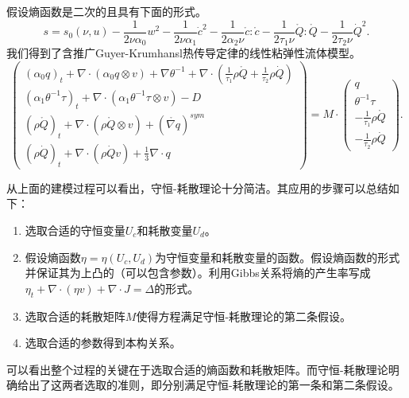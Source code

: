 假设熵函数是二次的且具有下面的形式。
	\begin{equation*}
		s = s_0(\nu,u)  - \frac{1}{2\nu \alpha_0} w^2 - \frac{1}{2\nu \alpha_1} \dot{c}^2- \frac{1}{2\alpha_2 \nu} \mathring{c}:\mathring{c} - \frac{1}{2 \tau_1 \nu} \mathring{Q}: \mathring{Q} - \frac{1}{2  \tau_2 \nu} \dot{Q}^2.
 	\end{equation*}  
我们得到了含推广Guyer-Krumhansl热传导定律的线性粘弹性流体模型。
\begin{equation}\label{eq:CNSTgeneral}
   	\left( \begin{array}{c} 
			(\alpha_0 q)_t +  \nabla \cdot (\alpha_0  q \otimes v)  + \nabla \theta^{-1} + \nabla \cdot (\frac{1}{\tau_1} \rho \mathring{{Q}}+\frac{1}{\tau_2} \rho \dot{Q})\\
			(\alpha_1 \theta^{-1}\tau)_t +  \nabla \cdot (\alpha_1 \theta^{-1} \tau \otimes v)  - D \\
			(\rho \mathring{{Q}})_t + \nabla \cdot (\rho \mathring{Q} \otimes v)+(\mathring{\nabla {q}})^{sym} \\ (\rho \dot{Q})_t + \nabla \cdot (\rho \dot{Q} v)+\frac{1}{3} \nabla \cdot {q}
		\end{array} \right) = M \cdot
		\left( \begin{array}{c} 
			q \\ \theta^{-1} \tau \\ -\frac{1}{\tau_1} \rho \mathring{{Q}} \\ -\frac{1}{\tau_2} \rho \dot{{Q}}
		\end{array}\right).
\end{equation}

从上面的建模过程可以看出，守恒-耗散理论十分简洁。其应用的步骤可以总结如下：
\begin{enumerate}
	\item 选取合适的守恒变量$U_c$和耗散变量$U_d$。
	\item 假设熵函数$\eta = \eta(U_c,U_d)$为守恒变量和耗散变量的函数。假设熵函数的形式并保证其为上凸的（可以包含参数）。利用Gibbs关系将熵的产生率写成$\eta_t+ \nabla \cdot (\eta v) + \nabla \cdot J = \Delta$的形式。
	\item 选取合适的耗散矩阵$M$使得方程满足守恒-耗散理论的第二条假设。
	\item 选取合适的参数得到本构关系。
\end{enumerate}
可以看出整个过程的关键在于选取合适的熵函数和耗散矩阵。而守恒-耗散理论明确给出了这两者选取的准则，即分别满足守恒-耗散理论的第一条和第二条假设。

